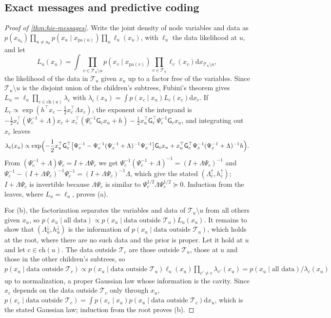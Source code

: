 \subsection*{Exact messages and predictive coding}

\begin{proof}[Proof of \cref{thm:hie-messages}]
Write the joint density of node variables and data as $p(x_{u_0})\prod_{u\ne u_0}p(x_u\mid x_{\mathrm{pa}(u)})\prod_u\ell_u(x_u)$, with $\ell_u$ the data likelihood at $u$, and let
\[
L_u(x_u)=\int\prod_{v\in\mathcal T_u\setminus u}p(x_v\mid x_{\mathrm{pa}(v)})\prod_{v\in\mathcal T_u}\ell_v(x_v)\mathrm dx_{\mathcal T_u\setminus u},
\]
the likelihood of the data in $\mathcal T_u$ given $x_u$ up to a factor free of the variables. Since $\mathcal T_u\setminus u$ is the disjoint union of the children's subtrees, Fubini's theorem gives $L_u=\ell_u\prod_{c\in\mathrm{ch}(u)}\lambda_c$ with $\lambda_c(x_u)=\int p(x_c\mid x_u)L_c(x_c)\mathrm dx_c$. If $L_c\propto\exp(h^\top x_c-\frac12x_c^\top\Lambda x_c)$, the exponent of the integrand is $-\frac12x_c^\top(\Psi_c^{-1}+\Lambda)x_c+x_c^\top(\Psi_c^{-1}\mathsf G_cx_u+h)-\frac12x_u^\top\mathsf G_c^\top\Psi_c^{-1}\mathsf G_cx_u$, and integrating out $x_c$ leaves
\[
\lambda_c(x_u)\propto\exp\Bigl(-\frac12x_u^\top\mathsf G_c^\top\bigl[\Psi_c^{-1}-\Psi_c^{-1}(\Psi_c^{-1}+\Lambda)^{-1}\Psi_c^{-1}\bigr]\mathsf G_cx_u+x_u^\top\mathsf G_c^\top\Psi_c^{-1}(\Psi_c^{-1}+\Lambda)^{-1}h\Bigr).
\]
From $(\Psi_c^{-1}+\Lambda)\Psi_c=I+\Lambda\Psi_c$ we get $\Psi_c^{-1}(\Psi_c^{-1}+\Lambda)^{-1}=(I+\Lambda\Psi_c)^{-1}$ and $\Psi_c^{-1}-(I+\Lambda\Psi_c)^{-1}\Psi_c^{-1}=(I+\Lambda\Psi_c)^{-1}\Lambda$, which give the stated $(\Lambda^\uparrow_c,h^\uparrow_c)$; $I+\Lambda\Psi_c$ is invertible because $\Lambda\Psi_c$ is similar to $\Psi_c^{1/2}\Lambda\Psi_c^{1/2}\succeq0$. Induction from the leaves, where $L_u=\ell_u$, proves (a).

For (b), the factorization separates the variables and data of $\mathcal T_u\setminus u$ from all others given $x_u$, so $p(x_u\mid\text{all data})\propto p(x_u\mid\text{data outside }\mathcal T_u)L_u(x_u)$. It remains to show that $(\Lambda^\downarrow_u,h^\downarrow_u)$ is the information of $p(x_u\mid\text{data outside }\mathcal T_u)$, which holds at the root, where there are no such data and the prior is proper. Let it hold at $u$ and let $c\in\mathrm{ch}(u)$. The data outside $\mathcal T_c$ are those outside $\mathcal T_u$, those at $u$ and those in the other children's subtrees, so $p(x_u\mid\text{data outside }\mathcal T_c)\propto p(x_u\mid\text{data outside }\mathcal T_u)\ell_u(x_u)\prod_{c'\neq c}\lambda_{c'}(x_u)=p(x_u\mid\text{all data})/\lambda_c(x_u)$ up to normalization, a proper Gaussian law whose information is the cavity. Since $x_c$ depends on the data outside $\mathcal T_c$ only through $x_u$, $p(x_c\mid\text{data outside }\mathcal T_c)=\int p(x_c\mid x_u)p(x_u\mid\text{data outside }\mathcal T_c)\mathrm dx_u$, which is the stated Gaussian law; induction from the root proves (b).


\end{proof}
